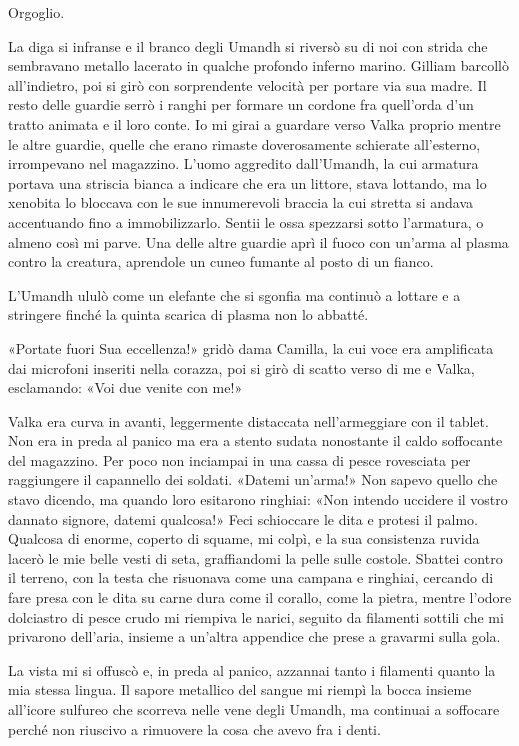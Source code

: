 Orgoglio.

La diga si infranse e il branco degli Umandh si riversò su di noi con
strida che sembravano metallo lacerato in qualche profondo inferno
marino. Gilliam barcollò all'indietro, poi si girò con sorprendente
velocità per portare via sua madre. Il resto delle guardie serrò i
ranghi per formare un cordone fra quell'orda d'un tratto animata e il
loro conte. Io mi girai a guardare verso Valka proprio mentre le altre
guardie, quelle che erano rimaste doverosamente schierate all'esterno,
irrompevano nel magazzino. L'uomo aggredito dall'Umandh, la cui armatura
portava una striscia bianca a indicare che era un littore, stava
lottando, ma lo xenobita lo {bloccava} con le sue innumerevoli braccia
la cui stretta si andava accentuando fino a immobilizzarlo. Sentii le
ossa spezzarsi sotto l'armatura, o almeno così mi parve. Una delle altre
guardie aprì il fuoco con un'arma al plasma contro la creatura,
aprendole un cuneo fumante al posto di un fianco.

L'Umandh ululò come un elefante che si sgonfia ma continuò a lottare e a
stringere finché la quinta scarica di plasma non lo abbatté.

«Portate fuori Sua eccellenza!» gridò dama Camilla, la cui voce era
amplificata dai microfoni inseriti nella corazza, poi si girò di scatto
verso di me e Valka, esclamando: «Voi due venite con me!»

Valka era curva in avanti, leggermente distaccata nell'armeggiare con il
tablet. Non era in preda al panico ma era a stento sudata nonostante il
caldo soffocante del magazzino. Per poco non inciampai in una cassa di
pesce rovesciata per raggiungere il capannello dei soldati. «Datemi
un'arma!» Non sapevo quello che stavo dicendo, ma quando loro esitarono
ringhiai: «Non intendo uccidere il vostro dannato signore, datemi
qualcosa!» Feci schioccare le dita e protesi il palmo. Qualcosa di
enorme, coperto di squame, mi colpì, e la sua consistenza ruvida lacerò
le mie belle vesti di seta, graffiandomi la pelle sulle costole. Sbattei
contro il terreno, con la testa che risuonava come una campana e
ringhiai, cercando di fare presa con le dita su carne dura come il
corallo, come la pietra, mentre l'odore dolciastro di pesce crudo mi
riempiva le narici, seguito da filamenti sottili che mi privarono
dell'aria, insieme a un'altra appendice che prese a gravarmi sulla gola.

La vista mi si offuscò e, in preda al panico, azzannai tanto i filamenti
quanto la mia stessa lingua. Il sapore metallico del sangue mi riempì la
bocca insieme all'icore sulfureo che scorreva nelle vene degli Umandh,
ma continuai a soffocare perché non riuscivo a rimuovere la cosa che
avevo fra i denti.


